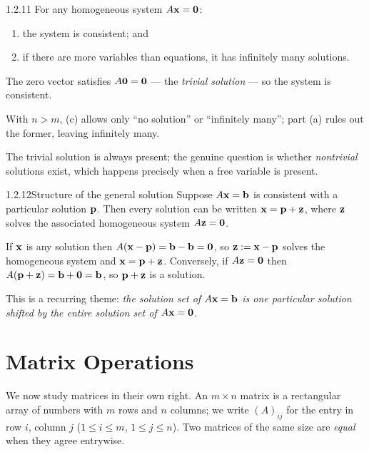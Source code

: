 \begin{thms}{1.2.11}{}
For any homogeneous system $A\mathbf{x}=\mathbf{0}$:
\begin{enumerate}[label=\textup{(\alph*)},leftmargin=2.2em,itemsep=1pt]
\item the system is consistent; and
\item if there are more variables than equations, it has infinitely many solutions.
\end{enumerate}
\end{thms}

\begin{prf}
 The zero vector satisfies $A\mathbf{0}=\mathbf{0}$ --- the \emph{trivial solution} --- so the system is consistent.

 With $n>m$, (c) allows only ``no solution'' or ``infinitely many''; part (a) rules out the former, leaving infinitely many.
\end{prf}

The trivial solution is always present; the genuine question is whether \emph{nontrivial} solutions exist, which happens precisely when a free variable is present.

\begin{thms}{1.2.12}{Structure of the general solution}
Suppose $A\mathbf{x}=\mathbf{b}$ is consistent with a particular solution $\mathbf{p}$. Then every solution can be written $\mathbf{x}=\mathbf{p}+\mathbf{z}$, where $\mathbf{z}$ solves the associated homogeneous system $A\mathbf{z}=\mathbf{0}$.
\end{thms}

\begin{prf}
If $\mathbf{x}$ is any solution then $A(\mathbf{x}-\mathbf{p})=\mathbf{b}-\mathbf{b}=\mathbf{0}$, so $\mathbf{z}:=\mathbf{x}-\mathbf{p}$ solves the homogeneous system and $\mathbf{x}=\mathbf{p}+\mathbf{z}$. Conversely, if $A\mathbf{z}=\mathbf{0}$ then $A(\mathbf{p}+\mathbf{z})=\mathbf{b}+\mathbf{0}=\mathbf{b}$, so $\mathbf{p}+\mathbf{z}$ is a solution.
\end{prf}

This is a recurring theme: \emph{the solution set of $A\mathbf{x}=\mathbf{b}$ is one particular solution shifted by the entire solution set of $A\mathbf{x}=\mathbf{0}$.}

\section{Matrix Operations}
\label{sec:1.3}

We now study matrices in their own right. An $m\times n$ matrix is a rectangular array of numbers with $m$ rows and $n$ columns; we write $(A)_{ij}$ for the entry in row $i$, column $j$ ($1\le i\le m$, $1\le j\le n$). Two matrices of the same size are \emph{equal} when they agree entrywise.

